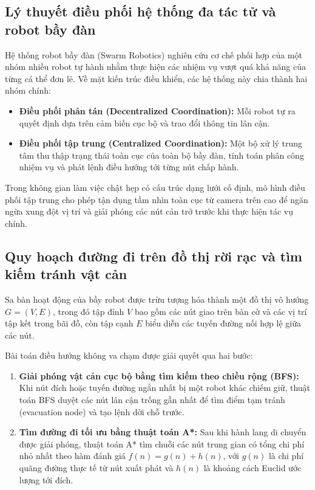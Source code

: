 \documentclass[12pt,a4paper]{report}
\begin{document}
	\subsection{Lý thuyết điều phối hệ thống đa tác tử và robot bầy đàn}
	Hệ thống robot bầy đàn (Swarm Robotics) nghiên cứu cơ chế phối hợp của một nhóm nhiều robot tự hành nhằm thực hiện các nhiệm vụ vượt quá khả năng của từng cá thể đơn lẻ. Về mặt kiến trúc điều khiển, các hệ thống này chia thành hai nhóm chính:
	\begin{itemize}[leftmargin=1.2cm]
		\item \textbf{Điều phối phân tán (Decentralized Coordination):} Mỗi robot tự ra quyết định dựa trên cảm biến cục bộ và trao đổi thông tin lân cận.
		\item \textbf{Điều phối tập trung (Centralized Coordination):} Một bộ xử lý trung tâm thu thập trạng thái toàn cục của toàn bộ bầy đàn, tính toán phân công nhiệm vụ và phát lệnh điều hướng tới từng nút chấp hành.
	\end{itemize}
	Trong không gian làm việc chật hẹp có cấu trúc dạng lưới cố định, mô hình điều phối tập trung cho phép tận dụng tầm nhìn toàn cục từ camera trên cao để ngăn ngừa xung đột vị trí và giải phóng các nút cản trở trước khi thực hiện tác vụ chính.
	
	\subsection{Quy hoạch đường đi trên đồ thị rời rạc và tìm kiếm tránh vật cản}
	Sa bàn hoạt động của bầy robot được trừu tượng hóa thành một đồ thị vô hướng $G = (V, E)$, trong đó tập đỉnh $V$ bao gồm các nút giao trên bàn cờ và các vị trí tập kết trong bãi đỗ, còn tập cạnh $E$ biểu diễn các tuyến đường nối hợp lệ giữa các nút.
	
	Bài toán điều hướng không va chạm được giải quyết qua hai bước:
	\begin{enumerate}[leftmargin=1.2cm]
		\item \textbf{Giải phóng vật cản cục bộ bằng tìm kiếm theo chiều rộng (BFS):} Khi nút đích hoặc tuyến đường ngắn nhất bị một robot khác chiếm giữ, thuật toán BFS duyệt các nút lân cận trống gần nhất để tìm điểm tạm tránh (evacuation node) và tạo lệnh dời chỗ trước.
		\item \textbf{Tìm đường đi tối ưu bằng thuật toán A*:} Sau khi hành lang di chuyển được giải phóng, thuật toán A* tìm chuỗi các nút trung gian có tổng chi phí nhỏ nhất theo hàm đánh giá $f(n) = g(n) + h(n)$, với $g(n)$ là chi phí quãng đường thực tế từ nút xuất phát và $h(n)$ là khoảng cách Euclid ước lượng tới đích.
	\end{enumerate}
	
\end{document}
